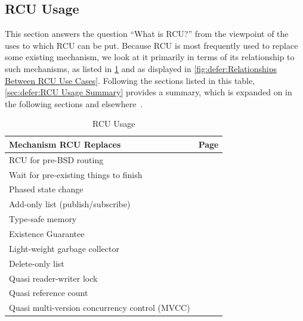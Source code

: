 
\subsection{RCU Usage}
\label{sec:defer:RCU Usage}

This section answers the question ``What is RCU?'' from the viewpoint
of the uses to which RCU can be put.
Because RCU is most frequently used to replace some existing mechanism,
we look at it primarily in terms of its relationship to such mechanisms,
as listed in \cref{tab:defer:RCU Usage}
and as displayed in \cref{fig:defer:Relationships Between RCU Use Cases}.
Following the sections listed in this table,
\cref{sec:defer:RCU Usage Summary} provides a summary,
which is expanded on in the following sections and
elsewhere~\cite{PaulEMcKenney2021RCUMysteriesFundamental,PaulEMcKenney2022RCUMysteriesUseCases}.

\begin{table}
\renewcommand*{\arraystretch}{1.2}
\centering
\small
\begin{tabular}{ll}
\toprule
Mechanism RCU Replaces & Page \\
\midrule
RCU for pre-BSD routing &
	\pageref{sec:defer:RCU for Pre-BSD Routing} \\
Wait for pre-existing things to finish &
	\pageref{sec:defer:Wait for Pre-Existing Things to Finish} \\
Phased state change &
	\pageref{sec:defer:Phased State Change} \\
Add-only list (publish/subscribe) &
	\pageref{sec:defer:Add-Only List} \\
Type-safe memory &
	\pageref{sec:defer:Type-Safe Memory} \\
Existence Guarantee &
	\pageref{sec:defer:Existence Guarantee} \\
Light-weight garbage collector &
	\pageref{sec:defer:Light-Weight Garbage Collector} \\
Delete-only list &
	\pageref{sec:defer:Delete-Only List} \\
Quasi reader-writer lock &
	\pageref{sec:defer:Quasi Reader-Writer Lock} \\
Quasi reference count &
	\pageref{sec:defer:Quasi Reference Count} \\
Quasi multi-version concurrency control (MVCC) &
	\pageref{sec:defer:Quasi Multi-Version Concurrency Control} \\
\bottomrule
\end{tabular}
\caption{RCU Usage}
\label{tab:defer:RCU Usage}
\end{table}


